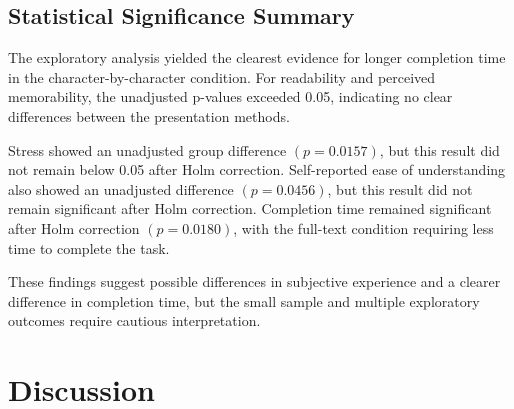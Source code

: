 \documentclass[authoryear]{elsarticle}
\begin{document}
\begin{table}[htbp]
  \centering
  \caption{Analysis Results by Item}
  \label{tab:test}
\end{table}

\subsection{Statistical Significance Summary}
The exploratory analysis yielded the clearest evidence for longer completion time in the character-by-character condition. For readability and perceived memorability, the unadjusted p-values exceeded 0.05, indicating no clear differences between the presentation methods.

Stress showed an unadjusted group difference $(p = 0.0157)$, but this result did not remain below 0.05 after Holm correction. Self-reported ease of understanding also showed an unadjusted difference $(p = 0.0456)$, but this result did not remain significant after Holm correction. Completion time remained significant after Holm correction $(p = 0.0180)$, with the full-text condition requiring less time to complete the task.

These findings suggest possible differences in subjective experience and a clearer difference in completion time, but the small sample and multiple exploratory outcomes require cautious interpretation.

\section{Discussion}
\end{document}
